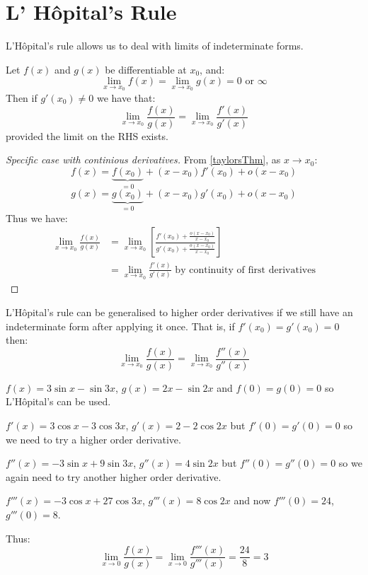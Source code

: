 \documentclass[../main.tex]{subfiles}
\begin{document}
\section{L' H\^opital's Rule}
\label{LHopitals}
L'H\^opital's rule allows us to deal with limits of indeterminate forms.
\begin{theorem}
  Let $f(x)$ and $g(x)$ be differentiable at $x_0$, and:
  \[
    \lim_{x \to x_0} f(x) = \lim_{x \to x_0} g(x) = 0 \text{ or } \infty
  \]
  Then if $g'(x_0) \neq 0$ we have that:
  \[
    \lim_{x \to x_0} \frac{f(x)}{g(x)} = \lim_{x \to x_0} \frac{f'(x)}{g'(x)}
  \]
  provided the limit on the RHS exists.
\end{theorem}
\begin{proof}[Specific case with continious derivatives]
  From \cref{taylorsThm}, as $x \to x_0$:
  \[
    f(x) = \underbrace{f(x_0)}_{=0} + (x - x_0)f'(x_0) + o(x - x_0)
  \]
  \[
    g(x) = \underbrace{g(x_0)}_{=0} + (x - x_0)g'(x_0) + o(x - x_0)
  \]
  Thus we have:
  \begin{align*}
    \lim_{x \to x_0} \frac{f(x)}{g(x)} &= \lim_{x \to x_0} \left[\frac{f'(x_0) + \frac{o(x-x_0)}{x-x_0}}{g'(x_0) + \frac{o(x-x_0)}{x-x_0}}\right] \\
                                       &= \lim_{x \to x_0} \frac{f'(x)}{g'(x)} \text{ by continuity of first derivatives}
  \end{align*}
\end{proof}
L'H\^opital's rule can be generalised to higher order derivatives if we still have an indeterminate form after applying it once.
That is, if $f'(x_0) = g'(x_0) = 0$ then:
\[
  \lim_{x \to x_0} \frac{f(x)}{g(x)} = \lim_{x \to x_0} \frac{f''(x)}{g''(x)}
\]
\begin{example}
  $f(x) = 3\sin x - \sin 3x$, $g(x) = 2x - \sin 2x$ and $f(0) = g(0) = 0$ so L'H\^opital's can be used.

  $f'(x) = 3\cos x - 3\cos3x$, $g'(x) = 2 - 2\cos2x$ but $f'(0) = g'(0) = 0$ so we need to try a higher order derivative.

  $f''(x) = -3\sin x + 9\sin3x$, $g''(x) = 4\sin2x$ but $f''(0) = g''(0) = 0$ so we again need to try another higher order derivative.

  $f'''(x) = -3\cos x + 27\cos3x$, $g'''(x) = 8\cos2x$ and now $f'''(0) = 24$, $g'''(0) = 8$.

  Thus:
  \[
    \lim_{x \to 0} \frac{f(x)}{g(x)} = \lim_{x \to 0} \frac{f'''(x)}{g'''(x)} = \frac{24}{8} = 3
  \]
\end{example}
\end{document}
